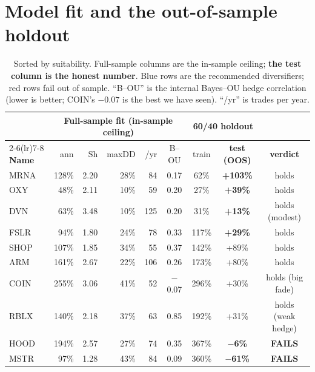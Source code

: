 \documentclass[11pt]{article}
\begin{document}
\section{Model fit and the out-of-sample holdout}

\begin{table}[H]\centering\small
\renewcommand{\arraystretch}{1.2}
\begin{tabular}{l r r r r c c c c}
\toprule
& \multicolumn{5}{c}{\textbf{Full-sample fit (in-sample ceiling)}} & \multicolumn{2}{c}{\textbf{60/40 holdout}} & \\
\cmidrule(lr){2-6}\cmidrule(lr){7-8}
\textbf{Name} & ann & Sh & maxDD & /yr & B--OU & train & \textbf{test (OOS)} & \textbf{verdict}\\
\midrule
\rowcolor{bckeep} MRNA & 128\% & 2.20 & 28\% & 84  & 0.17 & 62\%  & \textbf{+103\%} & holds\\
\rowcolor{bckeep} OXY  & 48\%  & 2.11 & 10\% & 59  & 0.20 & 27\%  & \textbf{+39\%}  & holds\\
\rowcolor{bckeep} DVN  & 63\%  & 3.48 & 10\% & 125 & 0.20 & 31\%  & \textbf{+13\%}  & holds (modest)\\
\rowcolor{bckeep} FSLR & 94\%  & 1.80 & 24\% & 78  & 0.33 & 117\% & \textbf{+29\%}  & holds\\
SHOP & 107\% & 1.85 & 34\% & 55  & 0.37 & 142\% & +89\% & holds\\
ARM  & 161\% & 2.67 & 22\% & 106 & 0.26 & 173\% & +80\% & holds\\
COIN & 255\% & 3.06 & 41\% & 52  & $-$0.07 & 296\% & +30\% & holds (big fade)\\
RBLX & 140\% & 2.18 & 37\% & 63  & 0.85 & 192\% & +31\% & holds (weak hedge)\\
\rowcolor{bcbad} HOOD & 194\% & 2.57 & 27\% & 74  & 0.35 & 367\% & \textbf{$-$6\%}  & \textbf{FAILS}\\
\rowcolor{bcbad} MSTR & 97\%  & 1.28 & 43\% & 84  & 0.09 & 360\% & \textbf{$-$61\%} & \textbf{FAILS}\\
\bottomrule
\end{tabular}
\caption*{\footnotesize Sorted by suitability. Full-sample columns are the in-sample ceiling;
\textbf{the test column is the honest number}. Blue rows are the recommended diversifiers; red
rows fail out of sample. ``B--OU'' is the internal Bayes--OU hedge correlation (lower is better;
COIN's $-0.07$ is the best we have seen). ``/yr'' is trades per year.}
\end{table}
\end{document}
